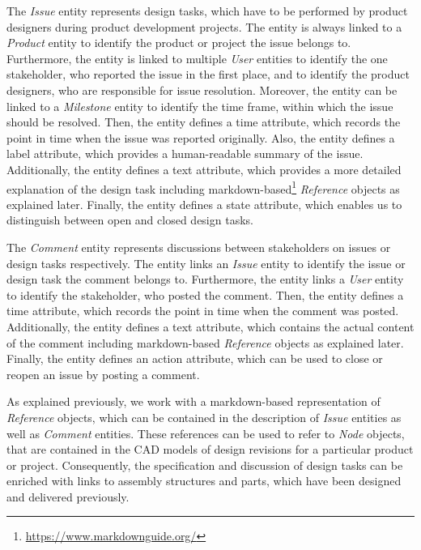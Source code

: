 The \textit{Issue} entity represents design tasks, which have to be performed by product designers during product development projects.
The entity is always linked to a \textit{Product} entity to identify the product or project the issue belongs to.
Furthermore, the entity is linked to multiple \textit{User} entities to identify the one stakeholder, who reported the issue in the first place, and to identify the product designers, who are responsible for issue resolution.
Moreover, the entity can be linked to a \textit{Milestone} entity to identify the time frame, within which the issue should be resolved.
Then, the entity defines a time attribute, which records the point in time when the issue was reported originally.
Also, the entity defines a label attribute, which provides a human-readable summary of the issue.
Additionally, the entity defines a text attribute, which provides a more detailed explanation of the design task including markdown-based\footnote{\url{https://www.markdownguide.org/}} \textit{Reference} objects as explained later.
Finally, the entity defines a state attribute, which enables us to distinguish between open and closed design tasks.

The \textit{Comment} entity represents discussions between stakeholders on issues or design tasks respectively.
The entity links an \textit{Issue} entity to identify the issue or design task the comment belongs to.
Furthermore, the entity links a \textit{User} entity to identify the stakeholder, who posted the comment.
Then, the entity defines a time attribute, which records the point in time when the comment was posted.
Additionally, the entity defines a text attribute, which contains the actual content of the comment including markdown-based \textit{Reference} objects as explained later.
Finally, the entity defines an action attribute, which can be used to close or reopen an issue by posting a comment.

As explained previously, we work with a markdown-based representation of \textit{Reference} objects, which can be contained in the description of \textit{Issue} entities as well as \textit{Comment} entities.
These references can be used to refer to \textit{Node} objects, that are contained in the CAD models of design revisions for a particular product or project.
Consequently, the specification and discussion of design tasks can be enriched with links to assembly structures and parts, which have been designed and delivered previously.